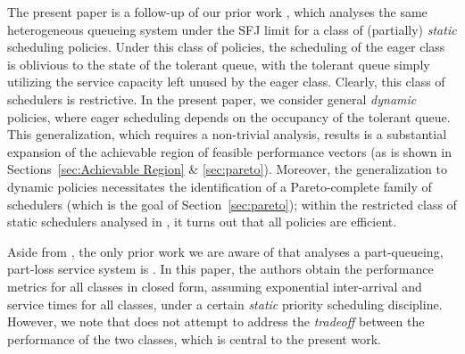 % 
%
The present paper is a follow-up of our prior work \cite{Value,ANOR},
which analyses the same heterogeneous queueing system under the SFJ
limit for a class of (partially) \emph{static} scheduling
policies. Under this class of policies, the scheduling of the eager
class is oblivious to the state of the tolerant queue, with the
tolerant queue simply utilizing the service capacity left unused by
the eager class. Clearly, this class of schedulers is restrictive. In
the present paper, we consider general \emph{dynamic} policies, where
eager scheduling depends on the occupancy of the tolerant queue. This
generalization, which requires a non-trivial analysis, results is a
substantial expansion of the achievable region of feasible performance
vectors (as is shown in Sections~\ref{sec:Achievable Region} \&
\ref{sec:pareto}). Moreover, the generalization to dynamic policies
necessitates the identification of a Pareto-complete family of
schedulers (which is the goal of Section~\ref{sec:pareto}); within the
restricted class of static schedulers analysed in \cite{Value,ANOR},
it turns out that all policies are efficient.

Aside from \cite{ANOR,Value}, the only prior work we are aware of that
analyses a part-queueing, part-loss service system is
\cite{CD_close}. In this paper, the authors obtain the performance
metrics for all classes in closed form, assuming exponential
inter-arrival and service times for all classes, under a certain {\it
  static} priority scheduling discipline. However, we note that
\cite{CD_close} does not attempt to address the \emph{tradeoff}
between the performance of the two classes, which is central to the
present work.
 
